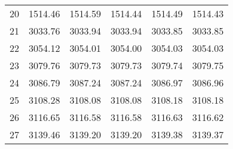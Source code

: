 \documentclass[10pt,oneside]{article}
\begin{document}
\begin{table}[h!]
\begin{tabular}{cccccc}
20 &   1514.46 & 1514.59 &    1514.44 & 1514.49 &   1514.43 \\
21 &   3033.76 & 3033.94 &    3033.94 & 3033.85 &   3033.85 \\
22 &   3054.12 & 3054.01 &    3054.00 & 3054.03 &   3054.03 \\
23 &   3079.76 & 3079.73 &    3079.73 & 3079.74 &   3079.75 \\
24 &   3086.79 & 3087.24 &    3087.24 & 3086.97 &   3086.96 \\
25 &   3108.28 & 3108.08 &    3108.08 & 3108.18 &   3108.18 \\
26 &   3116.65 & 3116.58 &    3116.58 & 3116.63 &   3116.62 \\
27 &   3139.46 & 3139.20 &    3139.20 & 3139.38 &   3139.37 \\
\bottomrule
\end{tabular}
\end{table}
\end{document}

